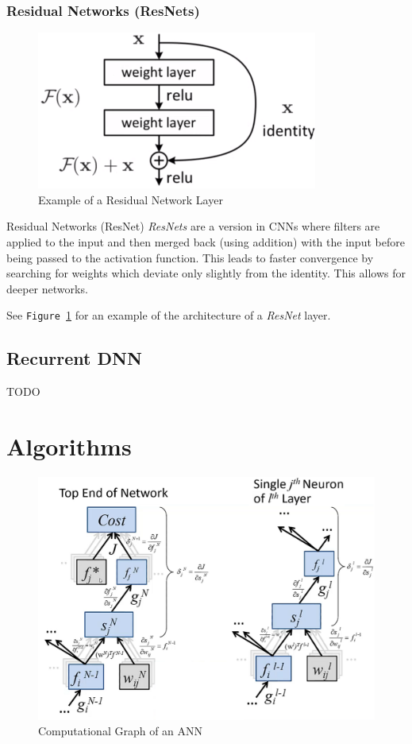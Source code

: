 \documentclass[11pt,a4paper]{article}
\begin{document}
\subsubsection{Residual Networks (ResNets)}

  \begin{figure}[ht!]
    \centering
    \includegraphics[width=.35\textwidth]{ResNet.PNG}
    \caption{Example of a Residual Network Layer}
    \label{fig:ResNet}
  \end{figure}

  \begin{proposition}{Residual Networks (ResNet)}
    \textit{ResNets} are a version in CNNs where filters are applied to the input and then merged back (using addition) with the input before being passed to the activation function. This leads to faster convergence by searching for weights which deviate only slightly from the identity. This allows for deeper networks.
    \par See \texttt{Figure \ref{fig:ResNet}} for an example of the architecture of a \textit{ResNet} layer.
  \end{proposition}

\subsection{Recurrent DNN}

TODO

\section{Algorithms}

  \begin{figure}[H]
    \centering
    \includegraphics[width=.5\textwidth]{NeuralNetworkComputationalGraph.PNG}
    \caption{Computational Graph of an ANN}
    \label{fig:Computational Graph}
  \end{figure}
\end{document}
